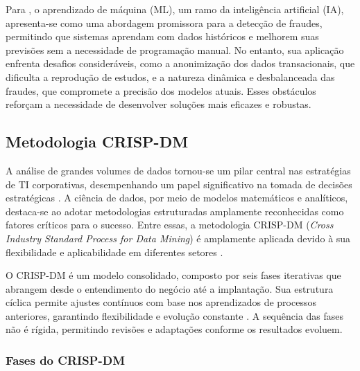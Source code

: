 \documentclass[12pt,a4paper]{article}
\begin{document}
Para \cite{bhati2024}, o aprendizado de máquina (ML), um ramo da inteligência artificial (IA), apresenta-se como uma abordagem promissora para a detecção de fraudes, permitindo que sistemas aprendam com dados históricos e melhorem suas previsões sem a necessidade de programação manual. No entanto, sua aplicação enfrenta desafios consideráveis, como a anonimização dos dados transacionais, que dificulta a reprodução de estudos, e a natureza dinâmica e desbalanceada das fraudes, que compromete a precisão dos modelos atuais. Esses obstáculos reforçam a necessidade de desenvolver soluções mais eficazes e robustas.

\subsection{Metodologia CRISP-DM}

A análise de grandes volumes de dados tornou-se um pilar central nas estratégias de TI corporativas, desempenhando um papel significativo na tomada de decisões estratégicas \cite{schroer2021}. A ciência de dados, por meio de modelos matemáticos e analíticos, destaca-se ao adotar metodologias estruturadas amplamente reconhecidas como fatores críticos para o sucesso. Entre essas, a metodologia CRISP-DM (\textit{Cross Industry Standard Process for Data Mining}) é amplamente aplicada devido à sua flexibilidade e aplicabilidade em diferentes setores \cite{silva2023}.

O CRISP-DM é um modelo consolidado, composto por seis fases iterativas que abrangem desde o entendimento do negócio até a implantação. Sua estrutura cíclica permite ajustes contínuos com base nos aprendizados de processos anteriores, garantindo flexibilidade e evolução constante \cite{brzozowska2023}. A sequência das fases não é rígida, permitindo revisões e adaptações conforme os resultados evoluem.

\subsubsection{Fases do CRISP-DM}
\end{document}
